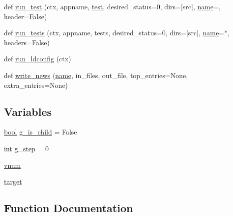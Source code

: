 \begin{DoxyCompactItemize}
\item 
def \hyperlink{namespacewaflib_1_1extras_1_1autowaf_af4e8ad0d58d1e2cebbda50fe5db24716}{run\+\_\+test} (ctx, appname, \hyperlink{patest__multi__sine_8c_a4e1a7dd05b97e23b3dd1aed354405b63}{test}, desired\+\_\+status=0, dirs=\mbox{[}\textquotesingle{}src\textquotesingle{}\mbox{]}, \hyperlink{lib_2expat_8h_a1b49b495b59f9e73205b69ad1a2965b0}{name}=\textquotesingle{}\textquotesingle{}, header=False)
\item 
def \hyperlink{namespacewaflib_1_1extras_1_1autowaf_a2f3e56b56bad990a13d15abb3c999936}{run\+\_\+tests} (ctx, appname, tests, desired\+\_\+status=0, dirs=\mbox{[}\textquotesingle{}src\textquotesingle{}\mbox{]}, \hyperlink{lib_2expat_8h_a1b49b495b59f9e73205b69ad1a2965b0}{name}=\textquotesingle{}$\ast$\textquotesingle{}, headers=False)
\item 
def \hyperlink{namespacewaflib_1_1extras_1_1autowaf_a42e4bf29e88cac78d9fa31a3390bff02}{run\+\_\+ldconfig} (ctx)
\item 
def \hyperlink{namespacewaflib_1_1extras_1_1autowaf_a1dc345b6e52594a9670401b3340ce85a}{write\+\_\+news} (\hyperlink{lib_2expat_8h_a1b49b495b59f9e73205b69ad1a2965b0}{name}, in\+\_\+files, out\+\_\+file, top\+\_\+entries=None, extra\+\_\+entries=None)
\end{DoxyCompactItemize}
\subsection*{Variables}
\begin{DoxyCompactItemize}
\item 
\hyperlink{mac_2config_2i386_2lib-src_2libsoxr_2soxr-config_8h_abb452686968e48b67397da5f97445f5b}{bool} \hyperlink{namespacewaflib_1_1extras_1_1autowaf_a0594f65572fc76447610c239d3368a6e}{g\+\_\+is\+\_\+child} = False
\item 
\hyperlink{xmltok_8h_a5a0d4a5641ce434f1d23533f2b2e6653}{int} \hyperlink{namespacewaflib_1_1extras_1_1autowaf_a9a6da8d3f637157debdecafca3316205}{g\+\_\+step} = 0
\item 
\hyperlink{namespacewaflib_1_1extras_1_1autowaf_a595bb8997cab8b2572e4276f8d6c0b2c}{vnum}
\item 
\hyperlink{namespacewaflib_1_1extras_1_1autowaf_a06695b839e6172999576c1e4ca473820}{target}
\end{DoxyCompactItemize}


\subsection{Function Documentation}
